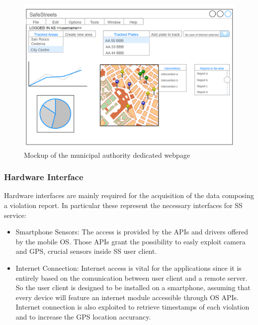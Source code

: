     \begin{figure}[h!]
    	\centering
    	\includegraphics[width=\textwidth]{Images/MunicipalAuthority_client_Mockup}
    	\caption{Mockup of the municipal authority dedicated webpage}
    \end{figure}
    
    \newpage
    
	\subsubsection{Hardware Interface}
	Hardware interfaces are mainly required for the acquisition of the data composing a violation report.
	In particular these represent the necessary interfaces for SS service:
		\begin{itemize}
			\item Smartphone Sensors:\newline
						The access is provided by the APIs and drivers offered by the mobile OS. Those APIs grant the possibility to easly exploit camera and GPS, crucial sensors inside SS user client.
			\item Internet Connection:\newline
						Internet access is vital for the applications since it is entirely based on the comunication between user client and a remote server. So the user client is designed to be installed on a smartphone, assuming that every device will feature an internet module accessible through OS APIs.\newline
						Internet connection is also exploited to retrieve timestamps of each violation and to increase the GPS location accurancy.
	\end{itemize}


